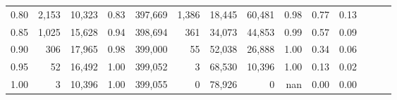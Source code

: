\begin{tabular}{rrrrrrrrrrrrrr}
0.80 &   2,153 &  10,323 &  0.83 &  397,669 &    1,386 &  18,445 &  60,481 &  0.98 &  0.77 &      0.13 \\
0.85 &   1,025 &  15,628 &  0.94 &  398,694 &      361 &  34,073 &  44,853 &  0.99 &  0.57 &      0.09 \\
0.90 &     306 &  17,965 &  0.98 &  399,000 &       55 &  52,038 &  26,888 &  1.00 &  0.34 &      0.06 \\
0.95 &      52 &  16,492 &  1.00 &  399,052 &        3 &  68,530 &  10,396 &  1.00 &  0.13 &      0.02 \\
1.00 &       3 &  10,396 &  1.00 &  399,055 &        0 &  78,926 &       0 &   nan &  0.00 &      0.00 \\
\bottomrule
\end{tabular}

